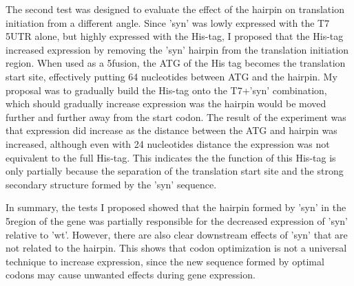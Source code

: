 The second test was designed to evaluate the effect of the hairpin on
translation initiation from a different angle. Since 'syn' was lowly expressed
with the T7 5\ppp UTR alone, but highly expressed with the His-tag, I proposed
that the His-tag increased expression by removing the 'syn' hairpin from the
translation initiation region. When used as a 5\ppp fusion, the ATG of the His
tag becomes the translation start site, effectively putting 64 nucleotides
between ATG and the hairpin. My proposal was to gradually build the His-tag
onto the T7+'syn' combination, which should gradually increase expression was
the hairpin would be moved further and further away from the start codon. The
result of the experiment was that expression did increase as the distance
between the ATG and hairpin was increased, although even with 24 nucleotides
distance the expression was not equivalent to the full His-tag. This indicates
the the function of this His-tag is only partially because the separation of
the translation start site and the strong secondary structure formed by the
'syn' sequence.

In summary, the tests I proposed showed that the hairpin formed by 'syn' in the
5\ppp region of the gene was partially responsible for the decreased expression
of 'syn' relative to 'wt'. However, there are also clear downstream effects of
'syn' that are not related to the hairpin. This shows that codon optimization
is not a universal technique to increase expression, since the new sequence
formed by optimal codons may cause unwanted effects during gene expression. 

